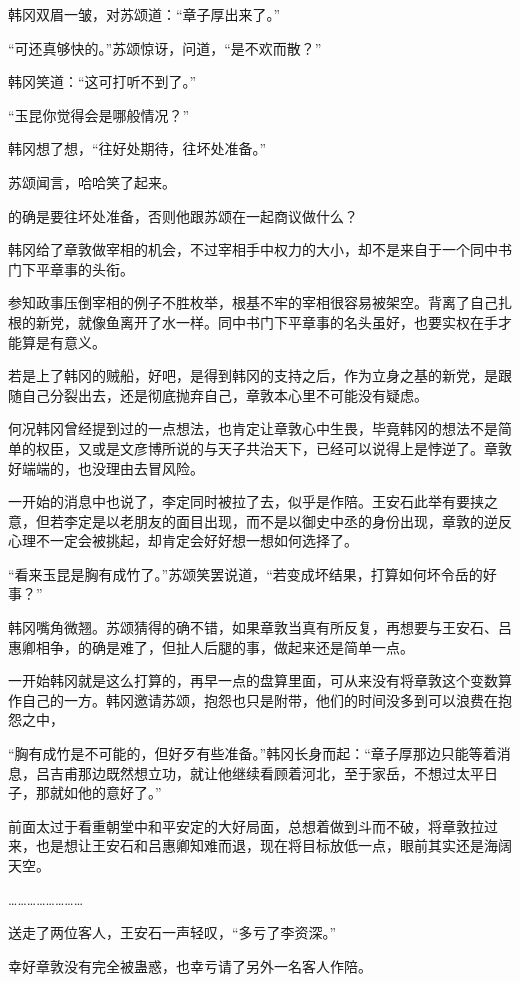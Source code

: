 韩冈双眉一皱，对苏颂道：“章子厚出来了。”

“可还真够快的。”苏颂惊讶，问道，“是不欢而散？”

韩冈笑道：“这可打听不到了。”

“玉昆你觉得会是哪般情况？”

韩冈想了想，“往好处期待，往坏处准备。”

苏颂闻言，哈哈笑了起来。

的确是要往坏处准备，否则他跟苏颂在一起商议做什么？

韩冈给了章敦做宰相的机会，不过宰相手中权力的大小，却不是来自于一个同中书门下平章事的头衔。

参知政事压倒宰相的例子不胜枚举，根基不牢的宰相很容易被架空。背离了自己扎根的新党，就像鱼离开了水一样。同中书门下平章事的名头虽好，也要实权在手才能算是有意义。

若是上了韩冈的贼船，好吧，是得到韩冈的支持之后，作为立身之基的新党，是跟随自己分裂出去，还是彻底抛弃自己，章敦本心里不可能没有疑虑。

何况韩冈曾经提到过的一点想法，也肯定让章敦心中生畏，毕竟韩冈的想法不是简单的权臣，又或是文彦博所说的与天子共治天下，已经可以说得上是悖逆了。章敦好端端的，也没理由去冒风险。

一开始的消息中也说了，李定同时被拉了去，似乎是作陪。王安石此举有要挟之意，但若李定是以老朋友的面目出现，而不是以御史中丞的身份出现，章敦的逆反心理不一定会被挑起，却肯定会好好想一想如何选择了。

“看来玉昆是胸有成竹了。”苏颂笑罢说道，“若变成坏结果，打算如何坏令岳的好事？”

韩冈嘴角微翘。苏颂猜得的确不错，如果章敦当真有所反复，再想要与王安石、吕惠卿相争，的确是难了，但扯人后腿的事，做起来还是简单一点。

一开始韩冈就是这么打算的，再早一点的盘算里面，可从来没有将章敦这个变数算作自己的一方。韩冈邀请苏颂，抱怨也只是附带，他们的时间没多到可以浪费在抱怨之中，

“胸有成竹是不可能的，但好歹有些准备。”韩冈长身而起：“章子厚那边只能等着消息，吕吉甫那边既然想立功，就让他继续看顾着河北，至于家岳，不想过太平日子，那就如他的意好了。”

前面太过于看重朝堂中和平安定的大好局面，总想着做到斗而不破，将章敦拉过来，也是想让王安石和吕惠卿知难而退，现在将目标放低一点，眼前其实还是海阔天空。

……………………

送走了两位客人，王安石一声轻叹，“多亏了李资深。”

幸好章敦没有完全被蛊惑，也幸亏请了另外一名客人作陪。

